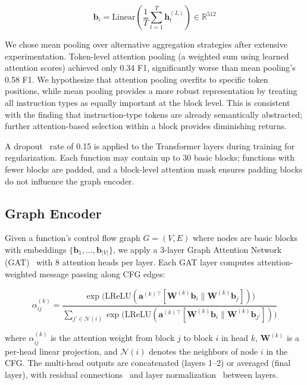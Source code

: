 \documentclass[sigconf,nonacm]{acmart}
\begin{document}
\begin{equation}
    \mathbf{b}_i = \text{Linear}\left(\frac{1}{T}\sum_{t=1}^{T} \mathbf{h}_t^{(L)}\right) \in \mathbb{R}^{512}
\end{equation}

We chose mean pooling over alternative aggregation strategies after extensive experimentation. Token-level attention pooling (a weighted sum using learned attention scores) achieved only 0.34 F1, significantly worse than mean pooling's 0.58 F1. We hypothesize that attention pooling overfits to specific token positions, while mean pooling provides a more robust representation by treating all instruction types as equally important at the block level. This is consistent with the finding that instruction-type tokens are already semantically abstracted; further attention-based selection within a block provides diminishing returns.

A dropout~\cite{dropout} rate of 0.15 is applied to the Transformer layers during training for regularization. Each function may contain up to 30 basic blocks; functions with fewer blocks are padded, and a block-level attention mask ensures padding blocks do not influence the graph encoder.

\subsection{Graph Encoder}
\label{sec:graph_encoder}

Given a function's control flow graph $G = (V, E)$ where nodes are basic blocks with embeddings $\{\mathbf{b}_1, \ldots, \mathbf{b}_{|V|}\}$, we apply a 3-layer Graph Attention Network (GAT)~\cite{velivckovic2018graph} with 8 attention heads per layer. Each GAT layer computes attention-weighted message passing along CFG edges:

{\small
\begin{equation}
    \alpha_{ij}^{(k)} = \frac{\exp\!\bigl(\text{LReLU}(\mathbf{a}^{(k)\top}[\mathbf{W}^{(k)}\mathbf{b}_i \| \mathbf{W}^{(k)}\mathbf{b}_j])\bigr)}{\sum_{j' \in \mathcal{N}(i)} \exp\!\bigl(\text{LReLU}(\mathbf{a}^{(k)\top}[\mathbf{W}^{(k)}\mathbf{b}_i \| \mathbf{W}^{(k)}\mathbf{b}_{j'}])\bigr)}
\end{equation}
}

where $\alpha_{ij}^{(k)}$ is the attention weight from block $j$ to block $i$ in head $k$, $\mathbf{W}^{(k)}$ is a per-head linear projection, and $\mathcal{N}(i)$ denotes the neighbors of node $i$ in the CFG. The multi-head outputs are concatenated (layers 1--2) or averaged (final layer), with residual connections~\cite{resnet} and layer normalization~\cite{layernorm} between layers.
\end{document}
